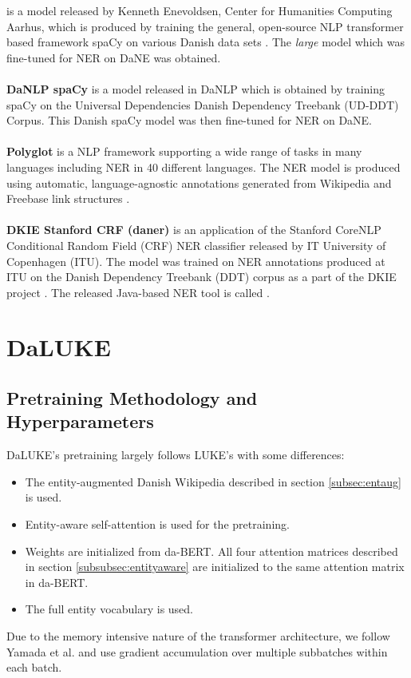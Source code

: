 \documentclass[main.tex]{subfiles}
\begin{document}
is a model released by Kenneth Enevoldsen, Center for Humanities Computing Aarhus, which is produced by training the general, open-source NLP transformer based framework spaCy \cite{honnibal2020spacy} on various Danish data sets \cite{enevoldsen2020dacy}.
The \emph{large} model which was fine-tuned for NER on DaNE was obtained.\\
\\
\textbf{DaNLP spaCy}
is a model released in DaNLP which is obtained by training spaCy \cite{honnibal2020spacy} on the Universal Dependencies Danish Dependency Treebank (UD-DDT) Corpus\cite{johann2015udddt}.
This Danish spaCy model was then fine-tuned for NER on DaNE.\\
\\
\textbf{Polyglot}
is a NLP framework supporting a wide range of tasks in many languages including NER in 40 different languages.
The NER model is produced using automatic, language-agnostic annotations generated from Wikipedia and Freebase link structures \cite{rfou2015polyglot}.\\
\\
\textbf{DKIE Stanford CRF (daner)}
is an application of the Stanford CoreNLP Conditional Random Field (CRF) NER classifier \cite{manning2014corenlp} released by IT University of Copenhagen (ITU).
The model was trained on NER annotations produced at ITU on the Danish Dependency Treebank (DDT) corpus \cite{kromann2003ddt} as a part of the DKIE project \cite{derc2014dkie}.
The released Java-based NER tool is called \footnotemark.

\section{DaLUKE}

\subsection{Pretraining Methodology and Hyperparameters}%
\label{sub:dalpre}
DaLUKE's pretraining largely follows LUKE's with some differences:
\begin{itemize}
    \item The entity-augmented Danish Wikipedia described in section \ref{subsec:entaug} is used.
    \item Entity-aware self-attention is used for the pretraining.
    \item Weights are initialized from da-BERT.
    All four attention matrices described in section \ref{subsubsec:entityaware} are initialized to the same attention matrix in da-BERT.
    \item The full entity vocabulary is used.
\end{itemize}
Due to the memory intensive nature of the transformer architecture, we follow Yamada et al. and use gradient accumulation over multiple subbatches within each batch.
\end{document}
